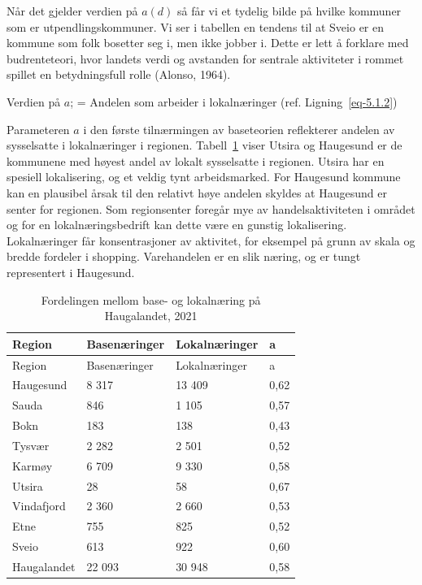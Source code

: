 \documentclass[
]{article}
\begin{document}
Når det gjelder verdien på \(a(d)\) så får vi et tydelig bilde på hvilke
kommuner som er utpendlingskommuner. Vi ser i tabellen en tendens til at
Sveio er en kommune som folk bosetter seg i, men ikke jobber i. Dette er
lett å forklare med budrenteteori, hvor landets verdi og avstanden for
sentrale aktiviteter i rommet spillet en betydningsfull rolle (Alonso,
1964).

Verdien på \(a\); = Andelen som arbeider i lokalnæringer (ref.
Ligning~\ref{eq-5.1.2})

Parameteren \(a\) i den første tilnærmingen av baseteorien reflekterer
andelen av sysselsatte i lokalnæringer i regionen.
Tabell~\ref{tbl-basis-lokal} viser Utsira og Haugesund er de kommunene
med høyest andel av lokalt sysselsatte i regionen. Utsira har en
spesiell lokalisering, og et veldig tynt arbeidsmarked. For Haugesund
kommune kan en plausibel årsak til den relativt høye andelen skyldes at
Haugesund er senter for regionen. Som regionsenter foregår mye av
handelsaktiviteten i området og for en lokalnæringsbedrift kan dette
være en gunstig lokalisering. Lokalnæringer får konsentrasjoner av
aktivitet, for eksempel på grunn av skala og bredde fordeler i shopping.
Varehandelen er en slik næring, og er tungt representert i Haugesund.

\hypertarget{tbl-basis-lokal}{}
\begin{longtable}[]{@{}llll@{}}
\caption{\label{tbl-basis-lokal}Fordelingen mellom base- og lokalnæring
på Haugalandet, 2021 }\tabularnewline
\toprule()
Region & Basenæringer & Lokalnæringer & a \\
\midrule()
\endfirsthead
\toprule()
Region & Basenæringer & Lokalnæringer & a \\
\midrule()
\endhead
Haugesund & 8 317 & 13 409 & 0,62 \\
Sauda & 846 & 1 105 & 0,57 \\
Bokn & 183 & 138 & 0,43 \\
Tysvær & 2 282 & 2 501 & 0,52 \\
Karmøy & 6 709 & 9 330 & 0,58 \\
Utsira & 28 & 58 & 0,67 \\
Vindafjord & 2 360 & 2 660 & 0,53 \\
Etne & 755 & 825 & 0,52 \\
Sveio & 613 & 922 & 0,60 \\
Haugalandet & 22 093 & 30 948 & 0,58 \\
\bottomrule()
\end{longtable}
\end{document}
